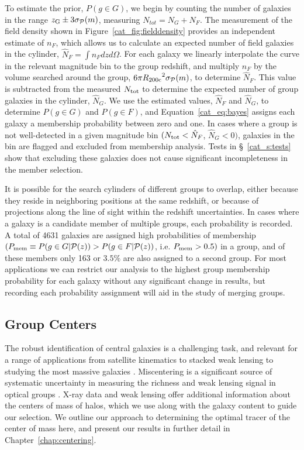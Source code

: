 To estimate the prior, $P(g \in G)$, we begin by counting the number
of galaxies in the range $\mbox{$z_{\rm G}$} \pm 3\sigma_{\mathcal{P}}(m)$, measuring
$N_{tot}=N_{G}+N_{F}$. The measurement of the field density shown in
Figure~\ref{cat_fig:fielddensity} provides an independent estimate of
$n_{F}$, which allows us to calculate an expected number of field
galaxies in the cylinder, $\hat{N}_F=\int{n_F dz d\Omega}$. For each
galaxy we linearly interpolate the curve in the relevant magnitude bin
to the group redshift, and multiply $n_F$ by the volume searched
around the group, $6\pi\mbox{$R_{200\rm{c}}$}^2\sigma_{\mathcal{P}}(m)$, to determine
$\hat{N}_F$. This value is subtracted from the measured $N_{\rm tot}$ to
determine the expected number of group galaxies in the cylinder,
$\hat{N}_{G}$. We use the estimated values, $\hat{N}_{F}$ and
$\hat{N}_{G}$, to determine $P(g \in G)$ and $P(g \in F)$, and
Equation~\ref{cat_eq:bayes} assigns each galaxy a membership probability
between zero and one. In cases where a group is not well-detected in a given
magnitude bin $(N_{\rm tot}<\hat{N}_{F}$, \ie{} $\hat{N}_{G}<0)$, galaxies
in the bin are flagged and excluded from membership
analysis. Tests in \S~\ref{cat_s:tests} show that excluding these galaxies
does not cause significant incompleteness in the member selection.

It is possible for the search cylinders of different groups to
overlap, either because they reside in neighboring positions at the
same redshift, or because of projections along the line of sight
within the redshift uncertainties. In cases where a galaxy is a
candidate member of multiple groups, each probability is
recorded. A total of 4631 galaxies are assigned high 
probabilities of membership $(P_{\rm mem} \equiv P(g \in G|\mbox{$\mathcal{P}(z)$}) > P(g
\in F|\mbox{$\mathcal{P}(z)$})$, i.e. $P_{\rm mem} > 0.5)$ in a group, and of these members only 163 or $3.5\%$ are also
assigned to a second group. For most applications we can restrict our 
analysis to the highest group membership probability for each galaxy
without any significant change in results, but recording each
probability assignment will aid in the study of merging groups.


\subsection{Group Centers}
\label{cat_s:centers}

The robust identification of central galaxies is a challenging task,
and relevant for a range of applications from satellite kinematics to
stacked weak lensing to studying the most massive galaxies
\citep[e.g.,][]{Skibba2011}. Miscentering is a significant source of
systematic uncertainty in measuring the richness and weak lensing
signal in optical groups \citep[e.g.,][]{Johnston2007, Rozo2011,
  Rykoff2011}. X-ray data and weak lensing offer additional
information about the centers of mass of halos, which we use along
with the galaxy content to guide our selection. We outline our approach to
determining the optimal tracer of the center of mass here, and present
our results in further detail in Chapter~\ref{chap:centering}.

